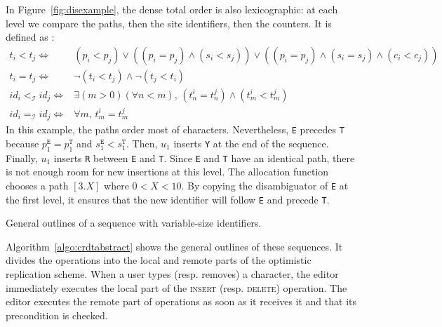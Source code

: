 In Figure~\ref{fig:disexample}, the dense total order is also lexicographic: at
each level we compare the paths, then the site identifiers, then the
counters. It is defined as :
\begin{align*}
  t_i < t_j \iff & (p_i < p_j) \vee  %
                  ((p_i = p_j) \wedge (s_i<s_j)) \vee %
                  ((p_i = p_j) \wedge (s_i = s_j) \wedge (c_i < c_j)) \\
  t_i = t_j \iff & \neg (t_i < t_j) \wedge \neg (t_j < t_i) \\
  id_i <_\mathcal{I} id_j \iff & \exists (m > 0)(\forall n < m),\, (t^i_n = t^j_n) \wedge                             (t^i_m < t^j_m) \\
  id_i =_\mathcal{I} id_j \iff & \forall m,\, t^i_m = t^j_m
\end{align*}
In this example, the paths order most of characters. Nevertheless, \texttt{E}
precedes \texttt{T} because $p^\texttt{E}_1=p^\texttt{T}_1$ and
$s^\texttt{E}_1 < s^\texttt{T}_1$. Then, $u_1$ inserts \texttt{Y} at the end of
the sequence. Finally, $u_1$ inserts \texttt{R} between \texttt{E} and
\texttt{T}. Since \texttt{E} and \texttt{T} have an identical path, there is not
enough room for new insertions at this level. The allocation function chooses a
path $[3.X]$ where $0<X<10$. By copying the disambiguator of \texttt{E} at the
first level, it ensures that the new identifier will follow \texttt{E} and
precede \texttt{T}.


\begin{algorithm}[h]
  
  \caption{\label{algo:crdtabstract}General outlines of a sequence with
    variable-size identifiers.}
\end{algorithm}


Algorithm~\ref{algo:crdtabstract} shows the general outlines of these
sequences. It divides the operations into the local and remote parts of the
optimistic replication scheme. When a user types (resp. removes) a character,
the editor immediately executes the local part of the \textsc{insert}
(resp. \textsc{delete}) operation. The editor executes the remote part of
operations as soon as it receives it and that its precondition is checked.

